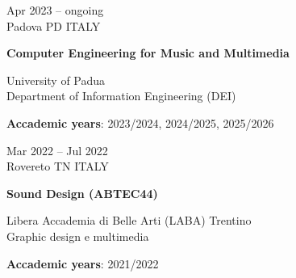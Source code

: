 \documentclass[7pt,a4paper]{article}
\begin{document}
\begin{mdframed}[
    backgroundcolor=entrygray,
    linecolor=entrygray,
    linewidth=0pt,
    innerleftmargin=6pt,
    innerrightmargin=6pt,
    innertopmargin=6pt,
    innerbottommargin=6pt,
    skipabove=0pt,
    skipbelow=0pt
]


\begin{minipage}[t]{0.28\textwidth}
\vspace{0pt}

Apr 2023 – ongoing
\\
\scriptsize Padova PD ITALY

\end{minipage}
\begin{minipage}[t]{0.68\textwidth}
\vspace{0pt}

\textbf{\normalsize Computer Engineering for Music and Multimedia}


\par University of Padua
\\\small Department of Information Engineering (DEI)





\scriptsize \textbf{Accademic years}: 2023/2024, 2024/2025, 2025/2026

\end{minipage}

\vspace{0.25cm}
\end{mdframed}


\begin{mdframed}[
    backgroundcolor=white,
    linecolor=white,
    linewidth=0pt,
    innerleftmargin=6pt,
    innerrightmargin=6pt,
    innertopmargin=6pt,
    innerbottommargin=6pt,
    skipabove=0pt,
    skipbelow=0pt
]


\begin{minipage}[t]{0.28\textwidth}
\vspace{0pt}

Mar 2022 – Jul 2022
\\
\scriptsize Rovereto TN ITALY

\end{minipage}
\begin{minipage}[t]{0.68\textwidth}
\vspace{0pt}

\textbf{\normalsize Sound Design (ABTEC44)}


\par Libera Accademia di Belle Arti (LABA) Trentino
\\\small Graphic design e multimedia





\scriptsize \textbf{Accademic years}: 2021/2022

\end{minipage}

\vspace{0.25cm}
\end{mdframed}
\end{document}
